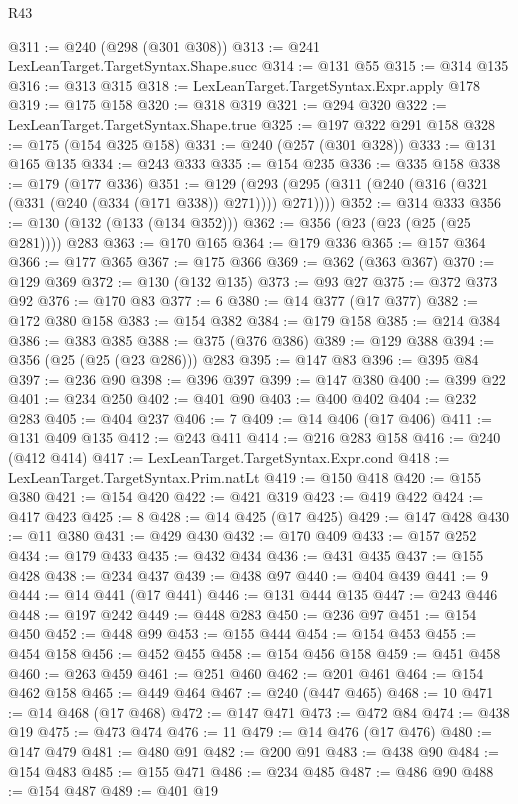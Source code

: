 \begin{lexlean}{R43}
\begin{coremodule}
@311 := @240 (@298 (@301 @308))
@313 := @241 LexLeanTarget.TargetSyntax.Shape.succ
@314 := @131 @55
@315 := @314 @135
@316 := @313 @315
@318 := LexLeanTarget.TargetSyntax.Expr.apply @178
@319 := @175 @158
@320 := @318 @319
@321 := @294 @320
@322 := LexLeanTarget.TargetSyntax.Shape.true
@325 := @197 @322 @291 @158
@328 := @175 (@154 @325 @158)
@331 := @240 (@257 (@301 @328))
@333 := @131 @165 @135
@334 := @243 @333
@335 := @154 @235
@336 := @335 @158
@338 := @179 (@177 @336)
@351 := @129 (@293 (@295 (@311 (@240 (@316 (@321 (@331 (@240 (@334 (@171 @338)) @271)))) @271))))
@352 := @314 @333
@356 := @130 (@132 (@133 (@134 @352)))
@362 := @356 (@23 (@23 (@25 (@25 @281)))) @283
@363 := @170 @165
@364 := @179 @336
@365 := @157 @364
@366 := @177 @365
@367 := @175 @366
@369 := @362 (@363 @367)
@370 := @129 @369
@372 := @130 (@132 @135)
@373 := @93 @27
@375 := @372 @373 @92
@376 := @170 @83
@377 := 6
@380 := @14 @377 (@17 @377)
@382 := @172 @380 @158
@383 := @154 @382
@384 := @179 @158
@385 := @214 @384
@386 := @383 @385
@388 := @375 (@376 @386)
@389 := @129 @388
@394 := @356 (@25 (@25 (@23 @286))) @283
@395 := @147 @83
@396 := @395 @84
@397 := @236 @90
@398 := @396 @397
@399 := @147 @380
@400 := @399 @22
@401 := @234 @250
@402 := @401 @90
@403 := @400 @402
@404 := @232 @283
@405 := @404 @237
@406 := 7
@409 := @14 @406 (@17 @406)
@411 := @131 @409 @135
@412 := @243 @411
@414 := @216 @283 @158
@416 := @240 (@412 @414)
@417 := LexLeanTarget.TargetSyntax.Expr.cond
@418 := LexLeanTarget.TargetSyntax.Prim.natLt
@419 := @150 @418
@420 := @155 @380
@421 := @154 @420
@422 := @421 @319
@423 := @419 @422
@424 := @417 @423
@425 := 8
@428 := @14 @425 (@17 @425)
@429 := @147 @428
@430 := @11 @380
@431 := @429 @430
@432 := @170 @409
@433 := @157 @252
@434 := @179 @433
@435 := @432 @434
@436 := @431 @435
@437 := @155 @428
@438 := @234 @437
@439 := @438 @97
@440 := @404 @439
@441 := 9
@444 := @14 @441 (@17 @441)
@446 := @131 @444 @135
@447 := @243 @446
@448 := @197 @242
@449 := @448 @283
@450 := @236 @97
@451 := @154 @450
@452 := @448 @99
@453 := @155 @444
@454 := @154 @453
@455 := @454 @158
@456 := @452 @455
@458 := @154 @456 @158
@459 := @451 @458
@460 := @263 @459
@461 := @251 @460
@462 := @201 @461
@464 := @154 @462 @158
@465 := @449 @464
@467 := @240 (@447 @465)
@468 := 10
@471 := @14 @468 (@17 @468)
@472 := @147 @471
@473 := @472 @84
@474 := @438 @19
@475 := @473 @474
@476 := 11
@479 := @14 @476 (@17 @476)
@480 := @147 @479
@481 := @480 @91
@482 := @200 @91
@483 := @438 @90
@484 := @154 @483
@485 := @155 @471
@486 := @234 @485
@487 := @486 @90
@488 := @154 @487
@489 := @401 @19

\end{coremodule}
\end{lexlean}
